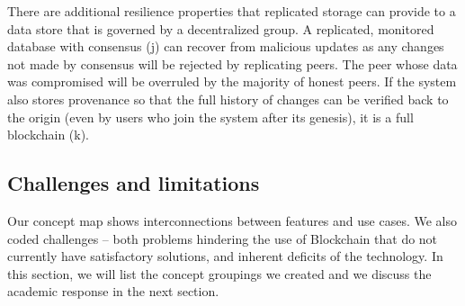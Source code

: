 {There are additional resilience properties that replicated storage can provide to a data store that is governed by a decentralized group. A replicated, monitored database with consensus (j) can recover from malicious updates as any changes not made by consensus will be rejected by replicating peers. The peer whose data was compromised will be overruled by the majority of honest peers. If the system also stores provenance so that the full history of changes can be verified back to the origin (even by users who join the system after its genesis), it is a full blockchain (k).

\subsection{Challenges and limitations}
\label{subsec:challenges}


Our concept map shows interconnections between features and use cases. We also coded challenges -- both problems hindering the use of Blockchain that do not currently have satisfactory solutions, and inherent deficits of the technology. In this section, we will list the concept groupings we created and we discuss the academic response in the next section.
}

